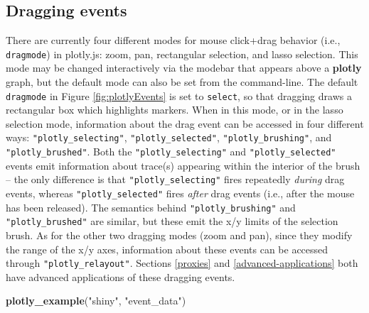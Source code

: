 \documentclass[
  12pt,
]{krantz}
\newenvironment{Shaded}{\begin{snugshade}}{\end{snugshade}}
\newcommand{\KeywordTok}[1]{\textcolor[rgb]{0.13,0.29,0.53}{\textbf{#1}}}
\newcommand{\NormalTok}[1]{#1}
\newcommand{\StringTok}[1]{\textcolor[rgb]{0.31,0.60,0.02}{#1}}
\begin{document}
\hypertarget{dragging-events}{%
\subsection{Dragging events}\label{dragging-events}}


There are currently four different modes for mouse click+drag behavior (i.e., \texttt{dragmode}) in plotly.js: zoom, pan, rectangular selection, and lasso selection. This mode may be changed interactively via the modebar that appears above a \textbf{plotly} graph, but the default mode can also be set from the command-line. The default \texttt{dragmode} in Figure \ref{fig:plotlyEvents} is set to \texttt{\textquotesingle{}select\textquotesingle{}}, so that dragging draws a rectangular box which highlights markers. When in this mode, or in the lasso selection mode, information about the drag event can be accessed in four different ways: \texttt{"plotly\_selecting"}, \texttt{"plotly\_selected"}, \texttt{"plotly\_brushing"}, and \texttt{"plotly\_brushed"}. Both the \texttt{"plotly\_selecting"} and \texttt{"plotly\_selected"} events emit information about trace(s) appearing within the interior of the brush -- the only difference is that \texttt{"plotly\_selecting"} fires repeatedly \emph{during} drag events, whereas \texttt{"plotly\_selected"} fires \emph{after} drag events (i.e., after the mouse has been released). The semantics behind \texttt{"plotly\_brushing"} and \texttt{"plotly\_brushed"} are similar, but these emit the x/y limits of the selection brush. As for the other two dragging modes (zoom and pan), since they modify the range of the x/y axes, information about these events can be accessed through \texttt{"plotly\_relayout"}. Sections \ref{proxies} and \ref{advanced-applications} both have advanced applications of these dragging events.

\begin{Shaded}
\begin{Highlighting}[]
\KeywordTok{plotly_example}\NormalTok{(}\StringTok{"shiny"}\NormalTok{, }\StringTok{"event_data"}\NormalTok{)}
\end{Highlighting}
\end{Shaded}
\end{document}
